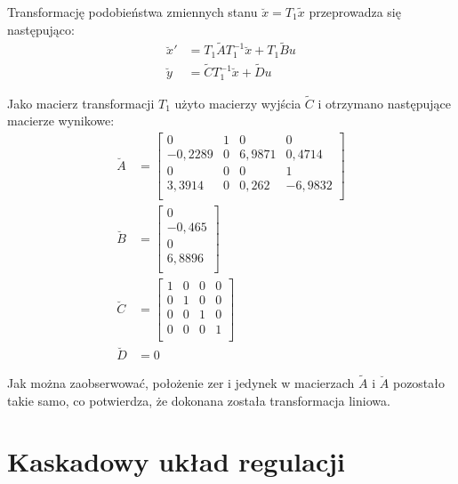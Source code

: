 Transformację podobieństwa zmiennych stanu $\breve{x} = T_1 \tilde{x}$ przeprowadza się następująco:
\begin{align}
    \breve{x}' &= T_1 \widetilde{A} T_1^{-1} \breve{x} + T_1 \widetilde{B} u \nonumber \\
    \breve{y} &= \widetilde{C} T_1^{-1} \breve{x} + \widetilde{D} u \label{eq:transformacja_x}
\end{align}

Jako macierz transformacji $T_1$ użyto macierzy wyjścia $\widetilde{C}$ i otrzymano następujące macierze wynikowe:
\begin{align}
    \breve{A} &= \begin{bmatrix}
         0 & 1 & 0 & 0 \\
         -0,2289 & 0 & 6,9871 & 0,4714 \\
         0 & 0 & 0 & 1 \\
         3,3914 & 0 & 0,262 & -6,9832 \\
    \end{bmatrix} \nonumber \\
    \breve{B} &= \begin{bmatrix}
         0 \\
         -0,465 \\
         0 \\
         6,8896 \\
    \end{bmatrix} \nonumber \\
    \breve{C} &= \begin{bmatrix}
        1 & 0 & 0 & 0 \\
        0 & 1 & 0 & 0 \\
        0 & 0 & 1 & 0 \\
        0 & 0 & 0 & 1 \\
    \end{bmatrix} \nonumber \\
    \breve{D} &= 0 \label{eq:macierze_stanu2}
\end{align}

Jak można zaobserwować, położenie zer i jedynek w macierzach $\widetilde{A}$ i $\breve{A}$ pozostało takie samo, co potwierdza, że dokonana została transformacja liniowa.

\section{Kaskadowy układ regulacji}
\label{sec:ch6_kaskadowy_uklad_regulacji}

